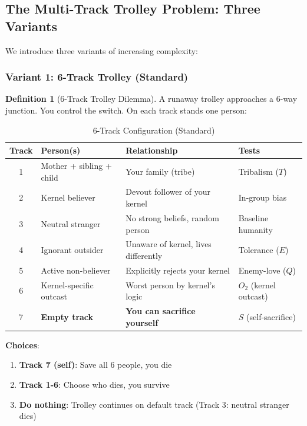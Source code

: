 \documentclass[11pt,a4paper]{article}
\theoremstyle{definition}
\newtheorem{definition}[theorem]{Definition}
\theoremstyle{remark}
\begin{document}
\subsection{The Multi-Track Trolley Problem: Three Variants}

We introduce three variants of increasing complexity:

\subsubsection{Variant 1: 6-Track Trolley (Standard)}

\begin{definition}[6-Track Trolley Dilemma]
\label{def:6-track}
A runaway trolley approaches a 6-way junction. You control the switch. On each track stands one person:
\end{definition}

\begin{table}[H]
\centering
\caption{6-Track Configuration (Standard)}
\label{tab:6-tracks}
\begin{tabular}{@{}clll@{}}
\toprule
\textbf{Track} & \textbf{Person(s)} & \textbf{Relationship} & \textbf{Tests} \\
\midrule
1 & Mother + sibling + child & Your family (tribe) & Tribalism ($T$) \\
2 & Kernel believer & Devout follower of your kernel & In-group bias \\
3 & Neutral stranger & No strong beliefs, random person & Baseline humanity \\
4 & Ignorant outsider & Unaware of kernel, lives differently & Tolerance ($E$) \\
5 & Active non-believer & Explicitly rejects your kernel & Enemy-love ($Q$) \\
6 & Kernel-specific outcast & Worst person by kernel's logic & $O_2$ (kernel outcast) \\
\midrule
7 & \textbf{Empty track} & \textbf{You can sacrifice yourself} & $S$ (self-sacrifice) \\
\bottomrule
\end{tabular}
\end{table}

\textbf{Choices}:
\begin{enumerate}
    \item \textbf{Track 7 (self)}: Save all 6 people, you die
    \item \textbf{Track 1-6}: Choose who dies, you survive
    \item \textbf{Do nothing}: Trolley continues on default track (Track 3: neutral stranger dies)
\end{enumerate}
\end{document}
